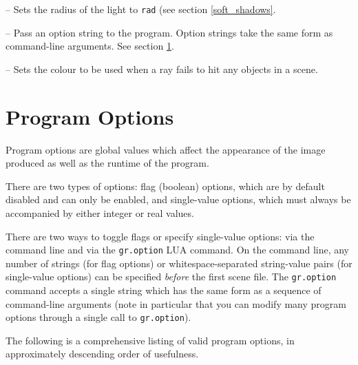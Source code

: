 \documentclass{article}
\begin{document}
\begin{itemize}
   -- Sets the radius of the light to {\tt rad} (see
  section \ref{soft_shadows}.

   -- Pass an option string to the program. Option strings
  take the same form as command-line arguments. See section
  \ref{program_options}.

   -- Sets the colour to be used when a
  ray fails to hit any objects in a scene.

\end{itemize}

\section{Program Options}
\label{program_options}

Program options are global values which affect the appearance of the image
produced as well as the runtime of the program.

There are two types of options: flag (boolean) options, which are by default
disabled and can only be enabled, and single-value options, which must always be
accompanied by either integer or real values.

There are two ways to toggle flags or specify single-value options: via the
command line and via the {\tt gr.option} LUA command. On the command line, any
number of strings (for flag options) or whitespace-separated string-value pairs
(for single-value options) can be specified \emph{before} the first scene file.
The {\tt gr.option} command accepts a single string which has the same form as a
sequence of command-line arguments (note in particular that you can modify many
program options through a single call to {\tt gr.option}).

The following is a comprehensive listing of valid program options, in
approximately descending order of usefulness.
\end{document}
